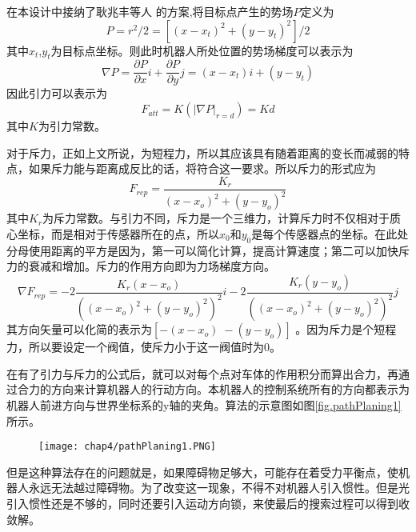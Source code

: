 在本设计中接纳了耿兆丰等人 的方案,将目标点产生的势场$P$定义为 \\
\begin{equation}
P = r^2/2 = [(x-x_t)^2+(y-y_t)^2]/2
\end{equation}
其中$x_t$,$y_t$为目标点坐标。则此时机器人所处位置的势场梯度可以表示为 \\
\begin{equation}
\nabla P = \frac{\partial P}{\partial x}i+\frac{\partial P}{\partial y}j = (x-x_t)i+(y-y_t)
\end{equation}
因此引力可以表示为 \\
\begin{equation}
F_{att} = K(|\nabla P|_{r=d})=Kd
\end{equation}
其中$K$为引力常数。

对于斥力，正如上文所说，为短程力，所以其应该具有随着距离的变长而减弱的特点，如果斥力能与距离成反比的话，将符合这一要求。所以斥力的形式应为 \\
\begin{equation}
F_{rep} = \frac{K_r}{(x-x_o)^2+(y-y_o)^2}
\end{equation}
其中$K_r$为斥力常数。与引力不同，斥力是一个三维力，计算斥力时不仅相对于质心坐标，而是相对于传感器所在的点，所以$x_0$和$y_0$是每个传感器点的坐标。在此处分母使用距离的平方是因为，第一可以简化计算，提高计算速度；第二可以加快斥力的衰减和增加。斥力的作用方向即为力场梯度方向。 \\
\begin{equation}
\nabla F_{rep} = -2\frac{K_r(x-x_o)}{((x-x_o)^2+(y-y_o)^2)^2}i-2\frac{K_r(y-y_o)}{((x-x_o)^2+(y-y_o)^2)^2}j
\end{equation}
其方向矢量可以化简的表示为$[-(x-x_o)\; -(y-y_o)]$ 。因为斥力是个短程力，所以要设定一个阀值，使斥力小于这一阀值时为0。

在有了引力与斥力的公式后，就可以对每个点对车体的作用积分而算出合力，再通过合力的方向来计算机器人的行动方向。本机器人的控制系统所有的方向都表示为机器人前进方向与世界坐标系的y轴的夹角。算法的示意图如图\ref{fig.pathPlaning1}所示。
\begin{figure}[!htp]
  \centering
  \texttt{[image: chap4/pathPlaning1.PNG]}
\end{figure}

但是这种算法存在的问题就是，如果障碍物足够大，可能存在着受力平衡点，使机器人永远无法越过障碍物。为了改变这一现象，不得不对机器人引入惯性。但是光引入惯性还是不够的，同时还要引入运动方向锁，来使最后的搜索过程可以得到收敛解。
